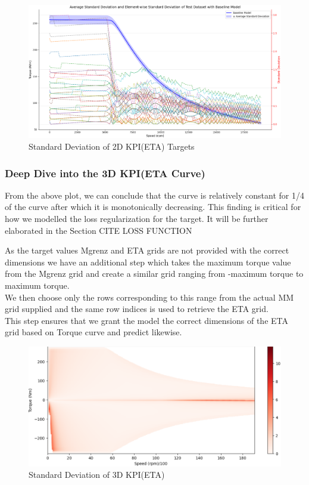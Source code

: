 \documentclass{report} %
\begin{document}
\begin{figure}[H]
    \centering
    \includegraphics[width=1\textwidth]{./ReportImages/stddev_y1.png} 
    \caption{Standard Deviation of 2D KPI(ETA) Targets} 
    \label{fig:Standard Deviation of 3D KPI(ETA) Targets}
\end{figure}

\subsubsection*{Deep Dive into the \ac{3D} KPI(ETA Curve)}

From the above plot, we can conclude that the curve is relatively constant for 1/4 of the curve after which it is monotonically decreasing.
This finding is critical for how we modelled the loss regularization for the target. It will be further elaborated in the Section CITE LOSS FUNCTION

As the target values Mgrenz and ETA grids are not provided with the correct dimensions we have an additional step which takes the maximum torque value from the Mgrenz grid and create a similar grid ranging from -maximum torque to maximum torque. \\
We then choose only the rows corresponding to this range from the actual MM grid supplied and the same row indices is used to retrieve the ETA grid. \\
This step ensures that we grant the model the correct dimensions of the ETA grid based on Torque curve and predict likewise.\\


\begin{figure}[H]
    \centering
    \includegraphics[width=1\textwidth]{./ReportImages/stddev_y2.png} 
    \caption{Standard Deviation of 3D KPI(ETA)} 
    \label{fig:Standard Deviation of 3D KPI(ETA)}
\end{figure}
\end{document}
